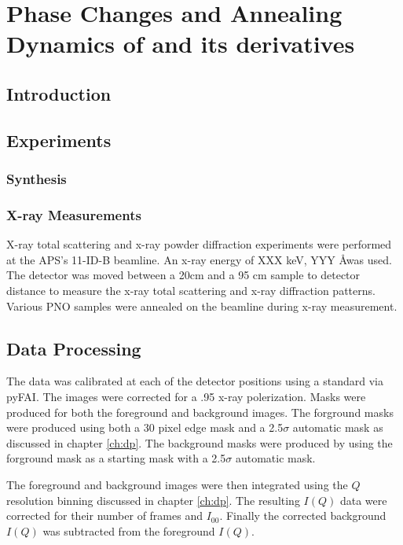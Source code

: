 \graphicspath{{./pno/figures/}}
\chapter{Phase Changes and Annealing Dynamics of  and its derivatives} \label{ch:pno}
\section{Introduction}
\section{Experiments}

\subsection{ Synthesis}

\subsection{X-ray Measurements}
X-ray total scattering and x-ray powder diffraction experiments were performed at the APS's 11-ID-B beamline.
An x-ray energy of XXX keV, YYY \AA was used.
The detector was moved between a 20cm and a 95 cm sample to detector distance to measure the x-ray total scattering and x-ray diffraction patterns.
Various PNO samples were annealed on the beamline during x-ray measurement.
\section{Data Processing}
The data was calibrated at each of the detector positions using a  standard via pyFAI. \cite{Kieffer2013}
The images were corrected for a .95 x-ray polerization.
Masks were produced for both the foreground and background images.
The forground masks were produced using both a 30 pixel edge mask and a 2.5$\sigma$ automatic mask as discussed in chapter \ref{ch:dp}.
The background masks were produced by using the forground mask as a starting mask with a 2.5$\sigma$ automatic mask.

The foreground and background images were then integrated using the $Q$ resolution binning discussed in chapter \ref{ch:dp}.
The resulting $I(Q)$ data were corrected for their number of frames and $I_{00}$.
Finally the corrected background $I(Q)$ was subtracted from the foreground $I(Q)$.

